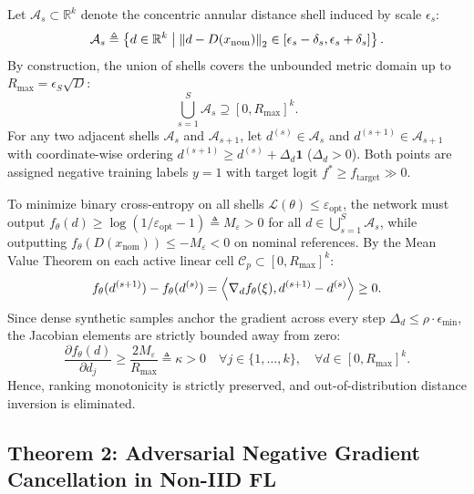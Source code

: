 \begin{IEEEproof}
Let $\mathcal{A}_s \subset \mathbb{R}^k$ denote the concentric annular distance shell induced by scale $\epsilon_s$:
\begin{equation}
\mathcal{A}_s \triangleq \left\{ d \in \mathbb{R}^k \;\middle|\; \left\lVert d - D(x_{\text{nom}})\right\rVert_2 \in [\epsilon_s - \delta_s, \epsilon_s + \delta_s] \right\}.
\end{equation}
By construction, the union of shells covers the unbounded metric domain up to $R_{\max} = \epsilon_S \sqrt{D}$:
\begin{equation}
\bigcup_{s=1}^S \mathcal{A}_s \supseteq [0, R_{\max}]^k.
\end{equation}
For any two adjacent shells $\mathcal{A}_s$ and $\mathcal{A}_{s+1}$, let $d^{(s)} \in \mathcal{A}_s$ and $d^{(s+1)} \in \mathcal{A}_{s+1}$ with coordinate-wise ordering $d^{(s+1)} \ge d^{(s)} + \Delta_d \mathbf{1}$ ($\Delta_d > 0$). Both points are assigned negative training labels $y=1$ with target logit $f^* \ge f_{\text{target}} \gg 0$. 

To minimize binary cross-entropy on all shells $\mathcal{L}(\theta) \le \varepsilon_{\text{opt}}$, the network must output $f_\theta(d) \ge \log(1 / \varepsilon_{\text{opt}} - 1) \triangleq M_{\varepsilon} > 0$ for all $d \in \bigcup_{s=1}^S \mathcal{A}_s$, while outputting $f_\theta(D(x_{\text{nom}})) \le -M_{\varepsilon} < 0$ on nominal references. By the Mean Value Theorem on each active linear cell $\mathcal{C}_p \subset [0, R_{\max}]^k$:
\begin{equation}
f_\theta(d^{(s+1)}) - f_\theta(d^{(s)}) = \left\langle\nabla_d f_\theta(\xi),d^{(s+1)} - d^{(s)}\right\rangle \ge 0.
\end{equation}
Since dense synthetic samples anchor the gradient across every step $\Delta_d \le \rho \cdot \epsilon_{\min}$, the Jacobian elements are strictly bounded away from zero:
\begin{equation}
\frac{\partial f_\theta(d)}{\partial d_j} \ge \frac{2 M_{\varepsilon}}{R_{\max}} \triangleq \kappa > 0 \quad \forall j \in \{1, \dots, k\}, \quad \forall d \in [0, R_{\max}]^k.
\end{equation}
Hence, ranking monotonicity is strictly preserved, and out-of-distribution distance inversion is eliminated.
\end{IEEEproof}

\subsection{Theorem 2: Adversarial Negative Gradient Cancellation in Non-IID FL}
\label{subsec:proof_theorem2}

